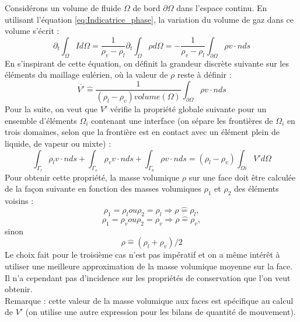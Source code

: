 Consid\'erons un volume de fluide $\Omega$ de bord $\partial\Omega$ dans l'espace continu. En utilisant l'\'equation \ref{eq:Indicatrice_phase}, la variation du volume de gaz dans ce volume s'\'ecrit :
\begin{equation}
\partial_{t} \int_{\Omega} I d\Omega = \dfrac{1}{\rho_{v}-\rho_{l}} \partial_{t} \int_{\Omega} \rho d\Omega = - \dfrac{1}{\rho_{v}-\rho_{l}} \int_{\partial\Omega} \rho v \cdot n ds \label{eq:FTD_varVolumeGaz}
\end{equation}
En s'inspirant de cette \'equation, on d\'efinit la grandeur discr\`ete suivante sur les \'el\'ements du maillage eul\'erien, o\`u la valeur de $\rho$ reste à d\'efinir :
\begin{equation}
\overline{V'} \hat{=} \dfrac{1}{(\rho_{l} - \rho_{v}) volume(\Omega)} \int_{\partial\Omega} \rho v \cdot n ds
\end{equation}
Pour la suite, on veut que $V'$ v\'erifie la propri\'et\'e globale suivante pour un ensemble d'\'el\'ements $\Omega_{i}$ contenant une interface (on s\'epare les frontières de $\Omega_{i}$ en trois domaines, selon que la fronti\`ere est en contact avec un \'el\'ement plein de liquide, de vapeur ou mixte) :
\begin{equation}
\int_{\Gamma_{l}} \rho_{l} v \cdot n ds + \int_{\Gamma_{v}} \rho_{v} v \cdot n ds + \int_{\Gamma_{b}} \rho v \cdot n ds = (\rho_{l} - \rho_{v}) \int_{\Omega i} V' d\Omega \label{eq:FTD_Vprime}
\end{equation}
Pour obtenir cette propri\'et\'e, la masse volumique $\rho$ sur une face doit \^etre calcul\'ee de la fa\c con suivante en fonction des masses volumiques $\rho_{1}$ et $\rho_{2}$ des \'el\'ements voisins :
\begin{equation}
\rho_{1} = \rho_{l} ou \rho_{2} = \rho_{l} \Rightarrow \rho \hat{=} \rho_{l},
\end{equation}
\begin{equation}
\rho_{1} = \rho_{v} ou \rho_{2} = \rho_{v} \Rightarrow \rho \hat{=} \rho_{v},
\end{equation}
sinon
\begin{equation}
\rho \hat{=} (\rho_{l} + \rho_{v}) /2 \label{eq:FTD_approxMasseVolumique}
\end{equation}
Le choix fait pour le troisi\`eme cas n'est pas imp\'eratif et on a m\^eme int\'er\^et \`a utiliser une meilleure approximation de la masse volumique moyenne sur la face. Il n'a cependant pas d'incidence sur les propri\'et\'es de conservation que l'on veut obtenir.\\
Remarque : cette valeur de la masse volumique aux faces est sp\'ecifique au calcul de $V'$ (on utilise une autre expression pour les bilans de quantit\'e de mouvement).

